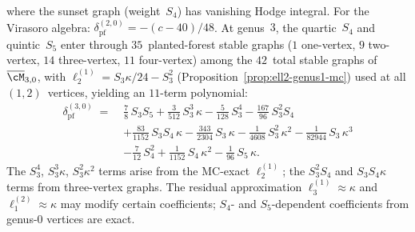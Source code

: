 \begin{remark}
\begin{itemize}
\begin{equation}
  \end{equation}
  where the sunset graph (weight~$S_4$) has vanishing Hodge integral.
  For the Virasoro algebra: $\delta_{\mathrm{pf}}^{(2,0)} = -(c-40)/48$.
  At genus~$3$, the quartic~$S_4$ and quintic~$S_5$ enter
  through $35$~planted-forest stable graphs ($1$ one-vertex,
  $9$ two-vertex, $14$ three-vertex, $11$ four-vertex)
  among the $42$~total stable graphs of $\overline{\cM}_{3,0}$,
  with $\ell_2^{(1)} = S_3\kappa/24 - S_3^2$
  (Proposition~\ref{prop:ell2-genus1-mc}) used at all $(1,2)$~vertices,
  yielding an $11$-term polynomial:
  \begin{equation}\label{eq:delta-pf-genus3-explicit}
  \begin{aligned}
    \delta_{\mathrm{pf}}^{(3,0)}
    \;=\;&
    \tfrac{7}{8}\,S_3 S_5
    + \tfrac{3}{512}\,S_3^3\,\kappa
    - \tfrac{5}{128}\,S_3^4
    - \tfrac{167}{96}\,S_3^2 S_4
    \\
    &+ \tfrac{83}{1152}\,S_3 S_4\,\kappa
    - \tfrac{343}{2304}\,S_3\,\kappa
    - \tfrac{1}{4608}\,S_3^2\,\kappa^2
    - \tfrac{1}{82944}\,S_3\,\kappa^3
    \\
    &- \tfrac{7}{12}\,S_4^2
    + \tfrac{1}{1152}\,S_4\,\kappa^2
    - \tfrac{1}{96}\,S_5\,\kappa.
  \end{aligned}
  \end{equation}
  The $S_3^4$, $S_3^3\kappa$, $S_3^2\kappa^2$ terms arise from
  the MC-exact $\ell_2^{(1)}$; the $S_3^2 S_4$ and $S_3 S_4\kappa$
  terms from three-vertex graphs.
  The residual approximation $\ell_3^{(1)} \approx \kappa$ and
  $\ell_1^{(2)} \approx \kappa$ may modify certain coefficients;
  $S_4$- and $S_5$-dependent coefficients from genus-$0$ vertices
  are exact.


\end{itemize}
\end{remark}
